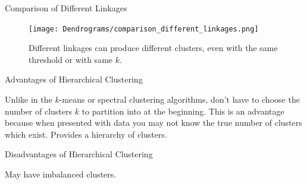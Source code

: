 \documentclass{beamer}
\begin{document}
\begin{frame}{Comparison of Different Linkages}
    \begin{figure}
        \centering
        \texttt{[image: Dendrograms/comparison\_different\_linkages.png]}
        \caption{Different linkages can produce different clusters, even with the same threshold or with same $k$.}
        \label{fig:enter-label}
    \end{figure}
\end{frame}
    


    

\begin{frame}{Advantages of Hierarchical Clustering}
    \begin{outline}
        \1 Unlike in the $k$-means or spectral clustering algorithms, don't have to choose the number of clusters $k$ to partition into at the beginning. This is an advantage because when presented with data you may not know the true number of clusters which exist.
        \1 Provides a hierarchy of clusters.
    \end{outline}
\end{frame}

\begin{frame}{Disadvantages of Hierarchical Clustering}
    \begin{outline}
        \1 May have imbalanced clusters.
    \end{outline}
\end{frame}
\end{document}

